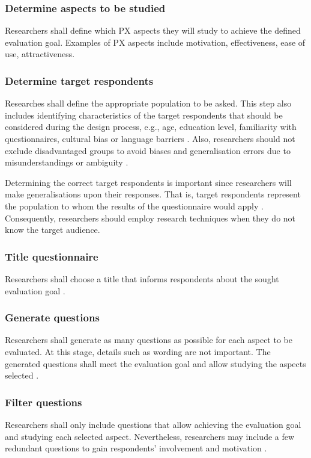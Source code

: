 \subsubsection{Determine aspects to be studied} 
Researchers shall define which \ac{PX} aspects they will study to achieve the defined evaluation goal. Examples of \ac{PX} aspects include motivation, effectiveness, ease of use, attractiveness.

\subsubsection{Determine target respondents}
Researches shall define the appropriate population to be asked. This step also includes identifying characteristics of the target respondents that should be considered during the design process, e.g., age, education level, familiarity with questionnaires, cultural bias or language barriers \cite{Diem,Crawford1997}. Also, researchers should not exclude disadvantaged groups to avoid biases and generalisation errors due to misunderstandings or ambiguity \cite{Boynton2004b}.

Determining the correct target respondents is important since researchers will make generalisations upon their responses. That is, target respondents represent the population to whom the results of the questionnaire would apply \cite{Crawford1997,Diem}. Consequently, researchers should employ research techniques when they do not know the target audience.

\subsubsection{Title questionnaire}
Researchers shall choose a title that informs respondents about the sought evaluation goal \cite{Diem}.

\subsubsection{Generate questions}
Researchers shall generate as many questions as possible for each aspect to be evaluated. At this stage, details such as wording are not important. The generated questions shall meet the evaluation goal and allow studying the aspects selected \cite{Crawford1997,Radhakrishna2007}.

\subsubsection{Filter questions}
Researchers shall only include questions that allow achieving the evaluation goal and studying each selected aspect. Nevertheless, researchers may include a few redundant questions to gain respondents' involvement and motivation \cite{Crawford1997}.

